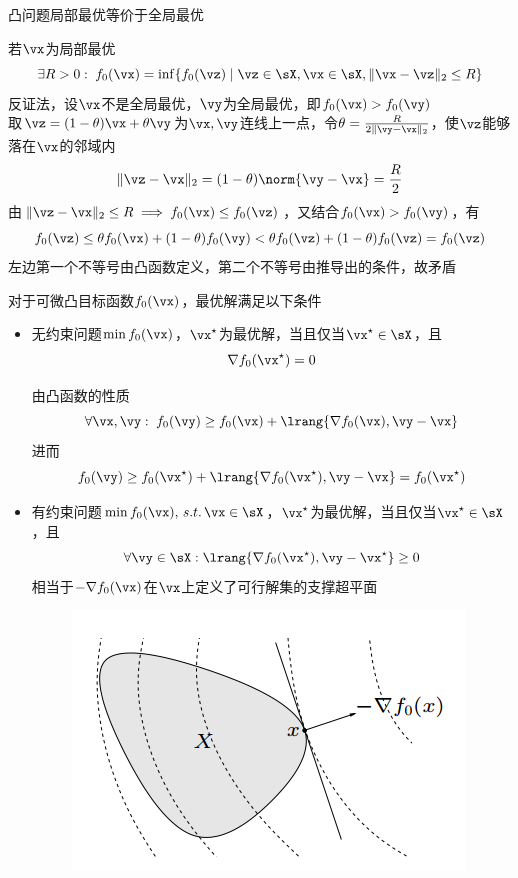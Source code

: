 \begin{theorem}
凸问题局部最优等价于全局最优
\end{theorem}
\begin{analysis}
若$\vx$为局部最优
\[\exists R>0:\;f_0(\vx)=\inf\{f_0(\vz)\mid \vz\in\sX,\vx\in\sX,\|\vx-\vz\|_2\leq R\}\]
反证法，设$\vx$不是全局最优，$\vy$为全局最优，即$f_0(\vx)>f_0(\vy)$\\
取$\vz=(1-\theta)\vx+ \theta\vy$为$\vx,\vy$连线上一点，令$\theta=\frac{R}{2\|\vy-\vx\|_2}$，使$\vz$能够落在$\vx$的邻域内
\[\|\vz-\vx\|_2=(1-\theta)\norm{\vy-\vx}=\frac{R}{2}\]
由$\|\vz-\vx\|_2\leq R\implies f_0(\vx)\leq f_0(\vz)$，又结合$f_0(\vx)>f_0(\vy)$，有
\[f_0(\vz)\leq\theta f_0(\vx)+(1-\theta)f_0(\vy)<\theta f_0(\vz)+(1-\theta)f_0(\vz)=f_0(\vz)\]
左边第一个不等号由凸函数定义，第二个不等号由推导出的条件，故矛盾
\end{analysis}

\begin{theorem}
对于可微凸目标函数$f_0(\vx)$，最优解满足以下条件
\begin{itemize}
	\item 无约束问题$\min f_0(\vx)$，$\vx^\star$为最优解，当且仅当$\vx^\star\in\sX$，且
	\[\nabla f_0(\vx^\star)=0\]
	\begin{analysis}
	由凸函数的性质
	\[\forall \vx,\vy:\;f_0(\vy)\geq f_0(\vx)+\lrang{\nabla f_0(\vx),\vy-\vx}\]
	进而
	\[f_0(\vy)\geq f_0(\vx^\star)+\lrang{\nabla f_0(\vx^\star),\vy-\vx}=f_0(\vx^\star)\]
	\end{analysis}
	\item 有约束问题$\min f_0(\vx),\,s.t.\,\vx\in\sX$，$\vx^\star$为最优解，当且仅当$\vx^\star\in\sX$，且
	\[\forall \vy\in \sX:\lrang{\nabla f_0(\vx^\star),\vy-\vx^\star}\geq 0\]
	相当于$-\nabla f_0(\vx)$在$\vx$上定义了可行解集的支撑超平面
	\begin{figure}[H]
		\centering
		\includegraphics[width=0.4\linewidth]{fig/optimal_criterion_diff.PNG}
	\end{figure}
\end{itemize}
\end{theorem}

